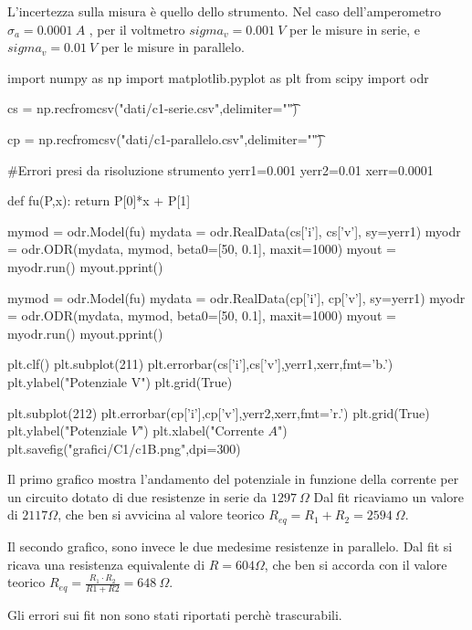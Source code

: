 L'incertezza sulla misura è quello dello strumento. Nel caso dell'amperometro $\sigma_a = 0.0001\ A$ , per il voltmetro
$sigma_v = 0.001\ V$ per le misure in serie, e $sigma_v = 0.01\ V$ per le misure in parallelo.
\\

\begin{sagesilent}
 
 import numpy as np
 import matplotlib.pyplot as plt
 from scipy import odr

 cs = np.recfromcsv("dati/c1-serie.csv",delimiter="\t")
 
 cp = np.recfromcsv("dati/c1-parallelo.csv",delimiter="\t")

 #Errori presi da risoluzione strumento
 yerr1=0.001
 yerr2=0.01
 xerr=0.0001
 
 def fu(P,x):
    return P[0]*x + P[1]

 mymod = odr.Model(fu)
 mydata = odr.RealData(cs['i'], cs['v'], sy=yerr1)
 myodr = odr.ODR(mydata, mymod, beta0=[50, 0.1], maxit=1000)
 myout = myodr.run()
 myout.pprint()
 
 mymod = odr.Model(fu)
 mydata = odr.RealData(cp['i'], cp['v'], sy=yerr1)
 myodr = odr.ODR(mydata, mymod, beta0=[50, 0.1], maxit=1000)
 myout = myodr.run()
 myout.pprint()

 plt.clf()
 plt.subplot(211)
 plt.errorbar(cs['i'],cs['v'],yerr1,xerr,fmt='b.')
 plt.ylabel("Potenziale V")
 plt.grid(True)
 
 plt.subplot(212)
 plt.errorbar(cp['i'],cp['v'],yerr2,xerr,fmt='r.')
 plt.grid(True)
 plt.ylabel("Potenziale $V$")
 plt.xlabel("Corrente $A$")
 plt.savefig("grafici/C1/c1B.png",dpi=300)
 
\end{sagesilent}


Il primo grafico mostra l'andamento del potenziale in funzione della corrente per un circuito dotato di due resistenze in serie da $1297\ \Omega$
Dal fit ricaviamo un valore di $2117 \Omega$, che ben si avvicina al valore teorico $R_{eq}=R_1+R_2= 2594\ \Omega$.

Il secondo grafico, sono invece le due medesime resistenze in parallelo. Dal fit si ricava una resistenza equivalente di
$R = 604 \Omega$, che ben si accorda con il valore teorico $R_{eq} = \frac{R_1 \cdot R_2}{R1+R2}=648\ \Omega$.

Gli errori sui fit non sono stati riportati perchè trascurabili. 
\\

